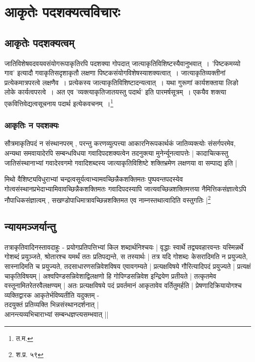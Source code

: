 \chapter{आकृतेः पदशक्यत्वविचारः}

\section{आकृतेः पदशक्यत्वम्} 
	
जातिविशेषवदवयवसंयोगरूपाकृतिरपि पदशक्या गोपदात् जात्याकृतिविशिष्टस्यैवानुभवात्~। 'पिष्टकमय्यो गाव' इत्यादौ गवाकृतिसदृशाकृतौ लक्षणा पिष्टकसंयोगविशेषस्याशक्यत्वात्~। जात्याकृतिव्यक्तीनां प्रत्येकमात्रपरत्वे लक्षणैव~। प्रत्येकस्य जात्याकृतिविशिष्टादन्यत्वात्~। यथा गुरूणां कार्यशक्ताया लिङो लोके कार्यत्वपरत्वे~। अत एव ’व्यक्त्याकृतिजातयस्तु पदार्थ’ इति पारमर्षसूत्रम्~। एकयैव शक्त्या एकवित्तिवेद्यत्वसूचनाय पदार्थ इत्येकवचनम्~।\footnote{त.म. }



\subsection{आकृतिः न पदशक्यः}

सौत्रमाकृतिपदं न संस्थानपरम् , परन्तु करणव्युत्पत्त्या आकारनिरूपकार्थकं जातिव्यक्त्योः संसर्गपरमेव, अन्यथा समवायादेरपि सम्बन्धविधया गवादिपदशक्यत्वेन तदनुक्त्या मुनेर्न्यूनत्वापत्तेः | कादाचित्कस्तु जातिसंस्थानाभ्यां गवादेरवगमो गवादिशब्दस्य जात्याकृतिविशिष्टे शक्तिभ्रमेण लक्षणया वा सम्पाद्य इति |

मिथो वैशिष्ट्यविधुराभ्यां चन्द्रत्वसूर्यत्वाभ्यामवच्छिन्नैकशक्तिमतः पुष्पवन्तपदस्येव गोत्वसंस्थानप्रभेदाभ्यामिवावच्छिन्नैकशक्तिमतः गवादिपदस्यापि जात्यवच्छिन्नशक्तिमत्तया नैमित्तिकसंज्ञात्वेऽपि नौपाधिकसंज्ञात्वम् , सखण्डोपाधिमात्रावच्छिन्नशक्तिमत एव नाम्नस्तथात्वादिति वस्तुगतिः |\footnote{श.प्र. ५९}


\section{न्यायमञ्जर्यान्तु} तत्राकृतिवादिनस्तावदाहुः - प्रयोगप्रतिपत्तिभ्यां किल शब्दार्थनिश्चयः | वृद्धाः स्वार्थे तद्व्यवहारवन्तः यस्मिन्नर्थे गोशब्दं प्रयुञ्जते, श्रोतारश्च यमर्थं ततः प्रतिपद्यन्ते, स तस्यार्थः | तत्र यदि गोशब्दः केसरादिमति न प्रयुज्यते, सास्नादिमति च प्रयुज्यते, तदसाधारणसन्निवेशविषय एवावगम्यते | प्रत्यक्षविषये गौरित्यादिपदं प्रयुज्यते | प्रत्यक्षं चाकृतिविषयम् | अश्वपिण्डसन्निवेशाद्विलक्षणो हि गोपिण्डसन्निवेश इन्द्रियेण प्रतीयते | तत्कृतमेव वस्तूनामितरेतरवैलक्षण्यम् | अतः प्रत्यक्षविषये पदं प्रवर्तमानं आकृतावेव वर्तितुमर्हति | प्रेषणादिक्रियायोगश्च व्यक्तिद्वारक आकृतेर्भविष्यतीति यदुक्तम् -\\ तदयुक्तं प्रतिव्यक्ति भिन्नसंस्थानदर्शनात् |\\ आनन्त्यव्यभिचाराभ्यां सम्बन्धज्ञप्त्यसम्भवात् ||

